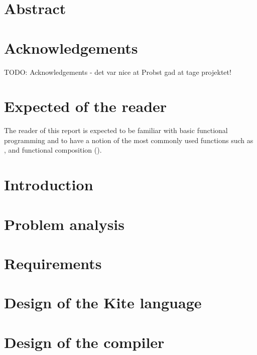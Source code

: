 \documentclass{article}
\begin{document}

\clearpage

\section*{Abstract}


\section*{Acknowledgements}
TODO: Acknowledgements - det var nice at Probst gad at tage projektet!

\section*{Expected of the reader}

The reader of this report is expected to be familiar with basic functional programming and to have a notion of the most commonly used functions such as ,  and functional composition ().

\clearpage

\tableofcontents
\clearpage

\section{Introduction}

\clearpage

\section{Problem analysis}
\label{sec:probanal}

\clearpage

\section{Requirements}
\label{sec:requirements}

\clearpage

\section{Design of the Kite language}
\label{sec:kite-design}

\clearpage

\section{Design of the compiler}
\label{sec:compiler-design}

\clearpage
\end{document}
